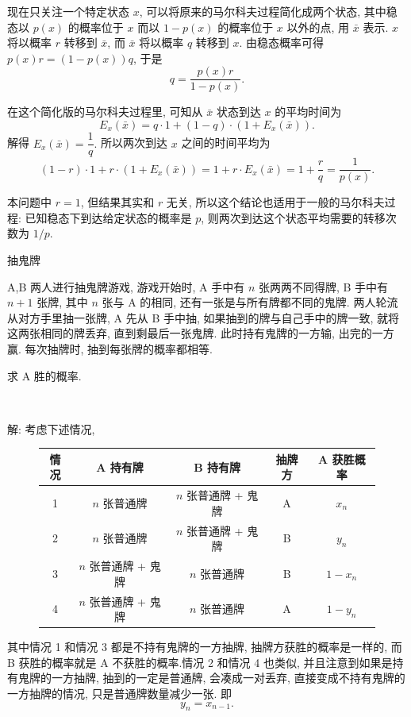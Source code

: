 \begin{figure}
\vspace{-1em}
\end{figure}
\mbox{}
现在只关注一个特定状态 $ x $, 可以将原来的马尔科夫过程简化成两个状态, 其中稳态以 $ p(x) $ 的概率位于 $ x $ 而以 $ 1 - p(x) $ 的概率位于 $ x $ 以外的点, 用 $ \bar{x} $ 表示. $ x $ 将以概率 $ r $ 转移到 $ \bar{x} $, 而 $ \bar{x} $ 将以概率 $ q $ 转移到 $ x $. 由稳态概率可得 $ p(x) r = (1-p(x))q $, 于是 
\[ q = \frac{p(x)r}{1-p(x)}. \]

在这个简化版的马尔科夫过程里, 可知从 $ \bar{x} $ 状态到达 $ x $ 的平均时间为 
\[ E_x(\bar{x}) = q\cdot 1 + (1-q)\cdot (1+E_x(\bar{x})). \]
解得 $ E_x(\bar{x}) = \dfrac{1}{q}.$ 所以两次到达 $ x $ 之间的时间平均为 
\[ (1-r)\cdot 1 + r\cdot (1+E_x(\bar{x})) = 1 + r\cdot E_x(\bar{x}) = 1 + \frac{r}{q} = \dfrac{1}{p(x)} .\]

本问题中 $ r = 1 $, 但结果其实和 $ r $ 无关, 所以这个结论也适用于一般的马尔科夫过程: 已知稳态下到达给定状态的概率是 $ p $, 则两次到达这个状态平均需要的转移次数为 $ 1/p $.


\newpage

\noindent 抽鬼牌

A,B 两人进行抽鬼牌游戏, 游戏开始时, A 手中有 $n$ 张两两不同得牌, B 手中有 $n+1$ 张牌, 其中 $n$ 张与 A 的相同, 还有一张是与所有牌都不同的鬼牌. 两人轮流从对方手里抽一张牌, A 先从 B 手中抽, 如果抽到的牌与自己手中的牌一致, 就将这两张相同的牌丢弃, 直到剩最后一张鬼牌. 此时持有鬼牌的一方输, 出完的一方赢. 每次抽牌时, 抽到每张牌的概率都相等.

求 A 胜的概率.

~

解: 考虑下述情况, 
\begin{figure}[htbp]
\centering
\setlength\extrarowheight{3pt}
\begin{tabular}{|c|c|c|c|c|}
\hline
情况 & A 持有牌  & B 持有牌  &  抽牌方 & A 获胜概率    \\ \hline
1 & $n$ 张普通牌 & $n$ 张普通牌 + 鬼牌 & A & $x_n$  \\ \hline
2 & $n$ 张普通牌 & $n$ 张普通牌 + 鬼牌 & B & $y_n$  \\ \hline
3 & $n$ 张普通牌 + 鬼牌 & $n$ 张普通牌 & B & $1-x_n$  \\ \hline
4 & $n$ 张普通牌 + 鬼牌 & $n$ 张普通牌 & A & $1-y_n$  \\ \hline
\end{tabular}
\end{figure}
其中情况 1 和情况 3 都是不持有鬼牌的一方抽牌, 抽牌方获胜的概率是一样的, 而 B 获胜的概率就是 A 不获胜的概率.情况 2 和情况 4 也类似, 并且注意到如果是持有鬼牌的一方抽牌, 抽到的一定是普通牌, 会凑成一对丢弃, 直接变成不持有鬼牌的一方抽牌的情况, 只是普通牌数量减少一张. 即
\[y_n = x_{n-1} .\]

